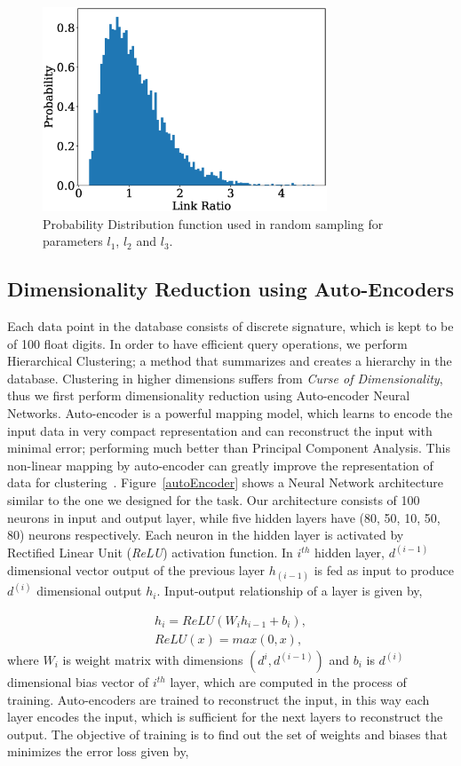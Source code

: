 \documentclass[twocolumn,10pt]{asme2ej}
\begin{document}
\begin{figure}
\centering
\includegraphics[width=240pt]{figure/fig_logNormal.eps}
  \caption{Probability Distribution function used in random sampling for parameters $l_1$, $l_2$ and $l_3$.}
\label{logNormal}
\end{figure}

\subsection{Dimensionality Reduction using Auto-Encoders}
Each data point in the database consists of discrete signature, which is kept to be of 100 float digits.
In order to have efficient query operations, we perform Hierarchical Clustering; a method that summarizes and creates a hierarchy in the database.
Clustering in higher dimensions suffers from \emph{Curse of Dimensionality}\cite{marimont1979}, thus we first perform dimensionality reduction using Auto-encoder Neural Networks.
Auto-encoder is a powerful mapping model, which learns to encode the input data in very compact representation and can reconstruct the input with minimal error; performing much better than Principal Component Analysis\cite{hinton2006}.
This non-linear mapping by auto-encoder can greatly improve the representation of data for clustering~\cite{song2013}.
Figure~\ref{autoEncoder} shows a Neural Network architecture similar to the one we designed for the task.
Our architecture consists of 100 neurons in input and output layer, while five hidden layers have (80, 50, 10, 50, 80) neurons respectively.
Each neuron in the hidden layer is activated by Rectified Linear Unit (\emph{ReLU}) activation function.
In $i^{th}$ hidden layer, $d^{(i-1)}$ dimensional vector output of the previous layer $h_(i-1)$ is fed as input to produce $d^{(i)}$ dimensional output $h_i$.
Input-output relationship of a layer is given by,

\begin{eqnarray}\label{nnlayer}
  h_i = ReLU(W_{i}h_{i-1} + b_{i}), \\
  ReLU(x) = max(0, x),
\end{eqnarray}
where $W_i$ is weight matrix with dimensions $(d^{i}, d^{(i-1)})$ and $b_i$ is $d^{(i)}$ dimensional bias vector of $i^{th}$ layer, which are computed in the process of training.
Auto-encoders are trained to reconstruct the input, in this way each layer encodes the input, which is sufficient for the next layers to reconstruct the output.
The objective of training is to find out the set of weights and biases that minimizes the error loss given by,
\end{document}

